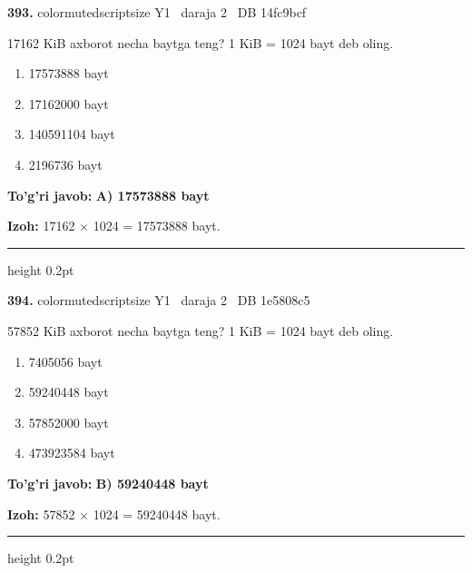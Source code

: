 \documentclass[10pt,a4paper,oneside]{article}
\begin{document}
\noindent\textbf{\color{ink}393.}  {color{muted}scriptsize Y1 \textbullet\ daraja 2 \textbullet\ DB 14fc9bcf}
\par
17162 KiB axborot necha baytga teng? 1 KiB = 1024 bayt deb oling.
\begin{enumerate}[label=\Alph*),leftmargin=9mm]
\item 17573888 bayt
\item 17162000 bayt
\item 140591104 bayt
\item 2196736 bayt
\end{enumerate}
\begin{tcolorbox}[enhanced,breakable,colback=teal!4,colframe=teal!50!black,boxrule=0.5pt,arc=1.1mm,left=3mm,right=3mm,top=1.7mm,bottom=1.7mm,before skip=2mm,after skip=2mm]
\textbf{\color{teal}To'g'ri javob:} \textbf{A) 17573888 bayt}
\par\smallskip
\textbf{Izoh:} 17162 \ensuremath{\times} 1024 = 17573888 bayt.
\end{tcolorbox}
\vspace{2mm}\hrule height 0.2pt \vspace{3mm}

\noindent\textbf{\color{ink}394.}  {color{muted}scriptsize Y1 \textbullet\ daraja 2 \textbullet\ DB 1e5808c5}
\par
57852 KiB axborot necha baytga teng? 1 KiB = 1024 bayt deb oling.
\begin{enumerate}[label=\Alph*),leftmargin=9mm]
\item 7405056 bayt
\item 59240448 bayt
\item 57852000 bayt
\item 473923584 bayt
\end{enumerate}
\begin{tcolorbox}[enhanced,breakable,colback=teal!4,colframe=teal!50!black,boxrule=0.5pt,arc=1.1mm,left=3mm,right=3mm,top=1.7mm,bottom=1.7mm,before skip=2mm,after skip=2mm]
\textbf{\color{teal}To'g'ri javob:} \textbf{B) 59240448 bayt}
\par\smallskip
\textbf{Izoh:} 57852 \ensuremath{\times} 1024 = 59240448 bayt.
\end{tcolorbox}
\vspace{2mm}\hrule height 0.2pt \vspace{3mm}
\end{document}
